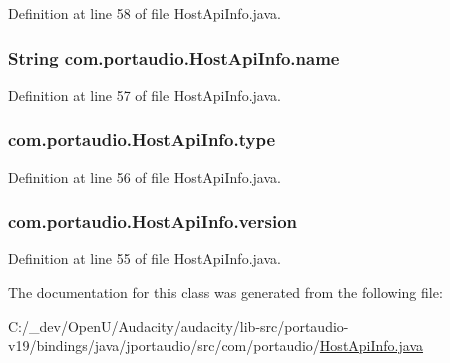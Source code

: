 Definition at line 58 of file Host\+Api\+Info.\+java.

\subsubsection[{\texorpdfstring{name}{name}}]{\setlength{\rightskip}{0pt plus 5cm}String com.\+portaudio.\+Host\+Api\+Info.\+name}\hypertarget{classcom_1_1portaudio_1_1_host_api_info_a8bc5a168bf5fab5ac8c18e8f15471d9a}{}\label{classcom_1_1portaudio_1_1_host_api_info_a8bc5a168bf5fab5ac8c18e8f15471d9a}


Definition at line 57 of file Host\+Api\+Info.\+java.

\subsubsection[{\texorpdfstring{type}{type}}]{ com.\+portaudio.\+Host\+Api\+Info.\+type}\hypertarget{classcom_1_1portaudio_1_1_host_api_info_a78cd3098a8ea7feca979e754b48a2c4e}{}\label{classcom_1_1portaudio_1_1_host_api_info_a78cd3098a8ea7feca979e754b48a2c4e}


Definition at line 56 of file Host\+Api\+Info.\+java.

\subsubsection[{\texorpdfstring{version}{version}}]{ com.\+portaudio.\+Host\+Api\+Info.\+version}\hypertarget{classcom_1_1portaudio_1_1_host_api_info_aa80dc8284f00dea7970ff20773f4bef4}{}\label{classcom_1_1portaudio_1_1_host_api_info_aa80dc8284f00dea7970ff20773f4bef4}


Definition at line 55 of file Host\+Api\+Info.\+java.



The documentation for this class was generated from the following file\+:\begin{DoxyCompactItemize}
\item 
C\+:/\+\_\+dev/\+Open\+U/\+Audacity/audacity/lib-\/src/portaudio-\/v19/bindings/java/jportaudio/src/com/portaudio/\hyperlink{_host_api_info_8java}{Host\+Api\+Info.\+java}\end{DoxyCompactItemize}
